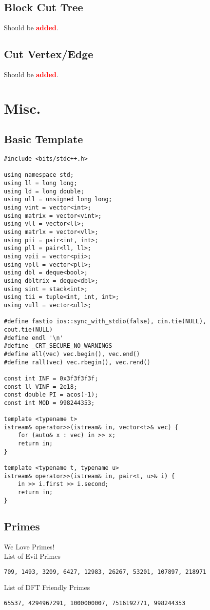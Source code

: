 \documentclass[landscape, 8pt, a4paper, oneside, twocolumn]{extarticle}
\newcommand{\added}{Should be \textcolor{red}{\textbf{added}}.}
\begin{document}
\subsection{Block Cut Tree}
\added
\subsection{Cut Vertex/Edge}
\added

\section{Misc.}
\subsection{Basic Template}
\begin{verbatim}
#include <bits/stdc++.h>

using namespace std;
using ll = long long;
using ld = long double;
using ull = unsigned long long;
using vint = vector<int>;
using matrix = vector<vint>;
using vll = vector<ll>;
using matrlx = vector<vll>;
using pii = pair<int, int>;
using pll = pair<ll, ll>;
using vpii = vector<pii>;
using vpll = vector<pll>;
using dbl = deque<bool>;
using dbltrix = deque<dbl>;
using sint = stack<int>;
using tii = tuple<int, int, int>;
using vull = vector<ull>;

#define fastio ios::sync_with_stdio(false), cin.tie(NULL), cout.tie(NULL)
#define endl '\n'
#define _CRT_SECURE_NO_WARNINGS
#define all(vec) vec.begin(), vec.end()
#define rall(vec) vec.rbegin(), vec.rend()

const int INF = 0x3f3f3f3f;
const ll VINF = 2e18;
const double PI = acos(-1);
const int MOD = 998244353;

template <typename t>
istream& operator>>(istream& in, vector<t>& vec) {
    for (auto& x : vec) in >> x;
    return in;
}

template <typename t, typename u>
istream& operator>>(istream& in, pair<t, u>& i) {
    in >> i.first >> i.second;
    return in;
}
\end{verbatim}
\subsection{Primes}
{We Love Primes!}\\
{List of Evil Primes}
\begin{verbatim}
709, 1493, 3209, 6427, 12983, 26267, 53201, 107897, 218971
\end{verbatim}
{List of DFT Friendly Primes}
\begin{verbatim}
65537, 4294967291, 1000000007, 7516192771, 998244353
\end{verbatim}
\end{document}
